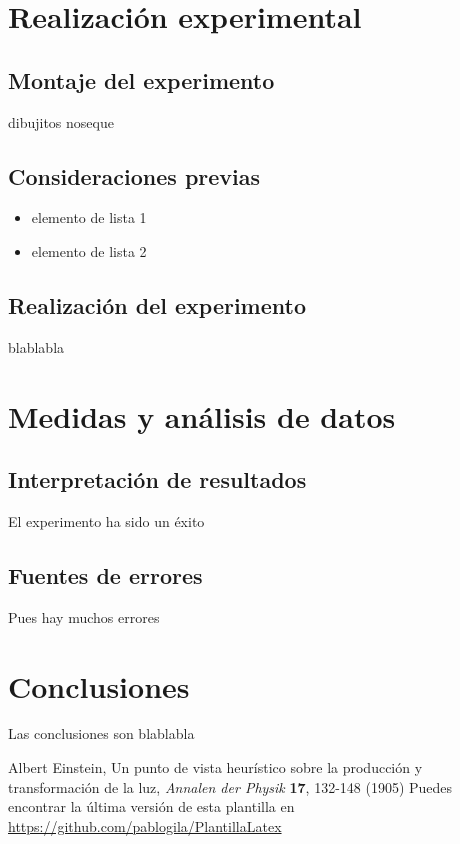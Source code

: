 \documentclass[12pt,a4paper]{article}
\begin{document}
\begin{multicols}{2}
\section{Realización experimental}
\subsection{Montaje del experimento}
dibujitos noseque

\subsection{Consideraciones previas}
\label{consideraciones}
\begin{itemize}
\item elemento de lista 1
\item elemento de lista 2
\end{itemize}

\subsection{Realización del experimento}
blablabla
\section{Medidas y análisis de datos}
\subsection{Interpretación de resultados}
El experimento ha sido un éxito
\subsection{Fuentes de errores}
Pues hay muchos errores

\end{multicols} %
\section{Conclusiones}
Las conclusiones son blablabla

\newpage
\begin{thebibliography}{99} %
 Albert Einstein, Un punto de vista heurístico sobre la producción y transformación de la luz, \textit{Annalen der Physik} \textbf{17}, 132-148 (1905)
 Puedes encontrar la última versión de esta plantilla en \url{https://github.com/pablogila/PlantillaLatex}
\end{thebibliography}
\end{document}
